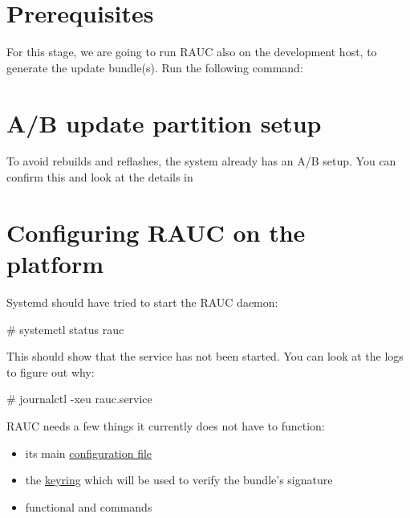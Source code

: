 
\section{Prerequisites}

For this stage, we are going to run RAUC also on the development host, to generate
the update bundle(s).
Run the following command:


\section{A/B update partition setup}

To avoid rebuilds and reflashes, the system already has an A/B setup.
You can confirm this and look at the details in 

\section{Configuring RAUC on the platform}

Systemd should have tried to start the RAUC daemon:

\begin{bashinput}
# systemctl status rauc
\end{bashinput}

This should show that the service has not been started.
You can look at the logs to figure out why:

\begin{bashinput}
# journalctl -xeu rauc.service
\end{bashinput}

RAUC needs a few things it currently does not have to function:
\begin{itemize}
  \item its main \href{https://rauc.readthedocs.io/en/latest/reference.html\#system-configuration-file}{configuration file}
  \item the \href{https://rauc.readthedocs.io/en/latest/reference.html\#keyring-section}{keyring} which will be used
	  to verify the bundle's signature
  \item functional  and  commands
\end{itemize}

